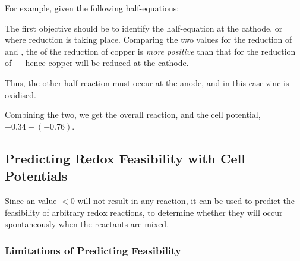 			For example, given the following half-equations:


			The first objective should be to identify the half-equation at the cathode, or where reduction is taking place. Comparing the two \Eo{}
			values for the reduction of  and , the \Eo{} of the reduction of copper is \textit{more positive} than that for
			the reduction of  --- hence copper will be reduced at the cathode.

			Thus, the other half-reaction must occur at the anode, and in this case zinc is oxidised.

			Combining the two, we get the overall reaction, and the cell potential, $+0.34 - (-0.76)$.



		\subsection{Predicting Redox Feasibility with Cell Potentials}

			Since an \Ecell{} value $ < 0$ will not result in any reaction, it can be used to predict the feasibility of arbitrary redox
			reactions, to determine whether they will occur spontaneously when the reactants are mixed.

			\subsubsection{Limitations of Predicting Feasibility}

